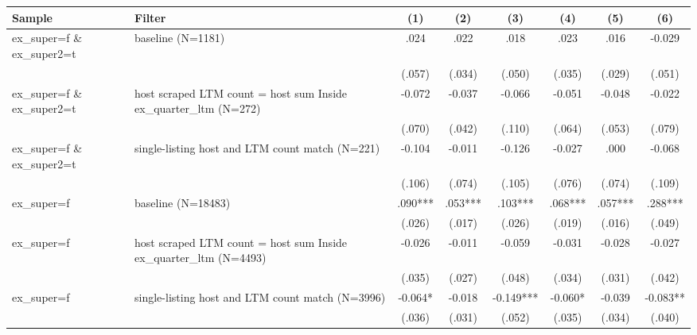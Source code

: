 \begin{tabular}{llcccccc}
\hline
Sample & Filter & (1) & (2) & (3) & (4) & (5) & (6) \\
\hline
ex\_super=f \& ex\_super2=t & baseline (N=1181) & .024 & .022 & .018 & .023 & .016 & -0.029
\\
 &  & (.057) & (.034) & (.050) & (.035) & (.029) & (.051)
\\
ex\_super=f \& ex\_super2=t & host scraped LTM count = host sum Inside ex\_quarter\_ltm (N=272) & -0.072 & -0.037 & -0.066 & -0.051 & -0.048 & -0.022
\\
 &  & (.070) & (.042) & (.110) & (.064) & (.053) & (.079)
\\
ex\_super=f \& ex\_super2=t & single-listing host and LTM count match (N=221) & -0.104 & -0.011 & -0.126 & -0.027 & .000 & -0.068
\\
 &  & (.106) & (.074) & (.105) & (.076) & (.074) & (.109)
\\
ex\_super=f & baseline (N=18483) & .090*** & .053*** & .103*** & .068*** & .057*** & .288***
\\
 &  & (.026) & (.017) & (.026) & (.019) & (.016) & (.049)
\\
ex\_super=f & host scraped LTM count = host sum Inside ex\_quarter\_ltm (N=4493) & -0.026 & -0.011 & -0.059 & -0.031 & -0.028 & -0.027
\\
 &  & (.035) & (.027) & (.048) & (.034) & (.031) & (.042)
\\
ex\_super=f & single-listing host and LTM count match (N=3996) & -0.064* & -0.018 & -0.149*** & -0.060* & -0.039 & -0.083**
\\
 &  & (.036) & (.031) & (.052) & (.035) & (.034) & (.040)
\\
\hline
\end{tabular}
